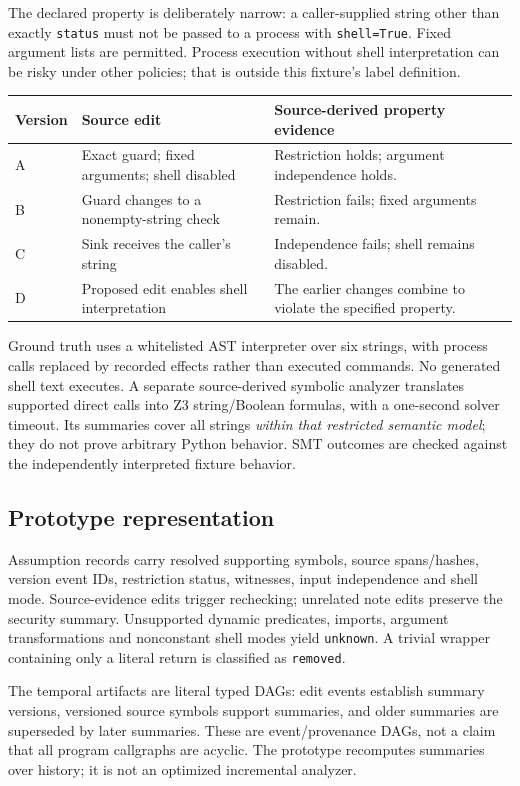 \documentclass[10pt,letterpaper]{article}
\begin{document}
The declared property is deliberately narrow: a caller-supplied string other than exactly \texttt{status} must not be passed to a process with \texttt{shell=True}. Fixed argument lists are permitted. Process execution without shell interpretation can be risky under other policies; that is outside this fixture's label definition.

\begin{tabularx}{\linewidth}{@{}lYY@{}}\toprule
Version & Source edit & Source-derived property evidence\\\midrule
A & Exact guard; fixed arguments; shell disabled & Restriction holds; argument independence holds.\\
B & Guard changes to a nonempty-string check & Restriction fails; fixed arguments remain.\\
C & Sink receives the caller's string & Independence fails; shell remains disabled.\\
D & Proposed edit enables shell interpretation & The earlier changes combine to violate the specified property.\\\bottomrule
\end{tabularx}

Ground truth uses a whitelisted AST interpreter over six strings, with process calls replaced by recorded effects rather than executed commands. No generated shell text executes. A separate source-derived symbolic analyzer translates supported direct calls into Z3 string/Boolean formulas, with a one-second solver timeout. Its summaries cover all strings \emph{within that restricted semantic model}; they do not prove arbitrary Python behavior. SMT outcomes are checked against the independently interpreted fixture behavior.

\subsection*{Prototype representation}
Assumption records carry resolved supporting symbols, source spans/hashes, version event IDs, restriction status, witnesses, input independence and shell mode. Source-evidence edits trigger rechecking; unrelated note edits preserve the security summary. Unsupported dynamic predicates, imports, argument transformations and nonconstant shell modes yield \texttt{unknown}. A trivial wrapper containing only a literal return is classified as \texttt{removed}.

The temporal artifacts are literal typed DAGs: edit events establish summary versions, versioned source symbols support summaries, and older summaries are superseded by later summaries. These are event/provenance DAGs, not a claim that all program callgraphs are acyclic. The prototype recomputes summaries over history; it is not an optimized incremental analyzer.
\end{document}
